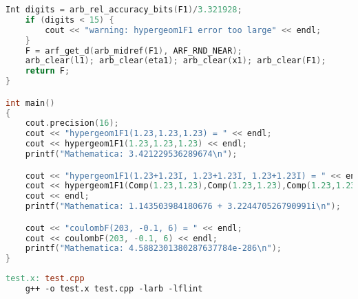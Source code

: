 \begin{lstlisting}[language=cpp, caption=test.cpp]
	Int digits = arb_rel_accuracy_bits(F1)/3.321928;
	if (digits < 15) {
		cout << "warning: hypergeom1F1 error too large" << endl;
	}
	F = arf_get_d(arb_midref(F1), ARF_RND_NEAR);
	arb_clear(l1); arb_clear(eta1); arb_clear(x1); arb_clear(F1);
	return F;
}

int main()
{
	cout.precision(16);
    cout << "hypergeom1F1(1.23,1.23,1.23) = " << endl;
	cout << hypergeom1F1(1.23,1.23,1.23) << endl;
	printf("Mathematica: 3.421229536289674\n");

	cout << "hypergeom1F1(1.23+1.23I, 1.23+1.23I, 1.23+1.23I) = " << endl;
	cout << hypergeom1F1(Comp(1.23,1.23),Comp(1.23,1.23),Comp(1.23,1.23))
    cout << endl;
	printf("Mathematica: 1.143503984180676 + 3.224470526790991i\n");

	cout << "coulombF(203, -0.1, 6) = " << endl;
	cout << coulombF(203, -0.1, 6) << endl;
	printf("Mathematica: 4.5882301380287637784e-286\n");
}
\end{lstlisting}

\begin{lstlisting}[language=makefile]
test.x: test.cpp
	g++ -o test.x test.cpp -larb -lflint
\end{lstlisting}
